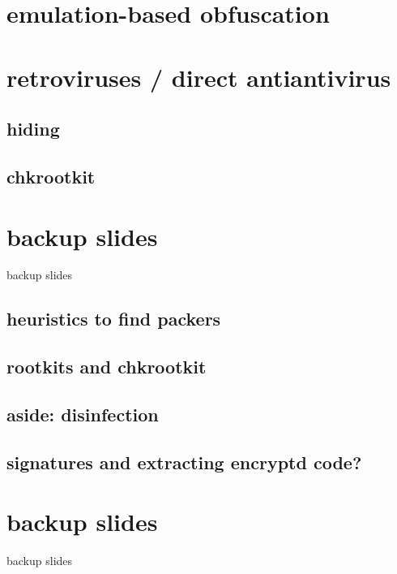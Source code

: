 \section{emulation-based obfuscation}


\section{retroviruses / direct antiantivirus}


\subsection{hiding}


\subsection{chkrootkit}



\section{backup slides}
\begin{frame}{backup slides}
\end{frame}

\subsection{heuristics to find packers}


\subsection{rootkits and chkrootkit}


\subsection{aside: disinfection}


\subsection{signatures and extracting encryptd code?}



\section{backup slides}
\begin{frame}{backup slides}
\end{frame}




